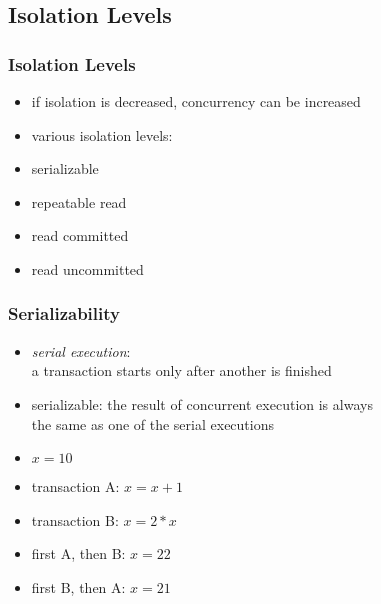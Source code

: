 \documentclass[dvipsnames]{beamer}
\theoremstyle{plain}
\begin{document}
\subsection{Isolation Levels}

\begin{frame}
  \frametitle{Isolation Levels}

  \begin{itemize}
    \item if isolation is decreased, concurrency can be increased
    \item various isolation levels:

    \bigskip
    \item serializable
    \item repeatable read
    \item read committed
    \item read uncommitted
  \end{itemize}
\end{frame}

\begin{frame}
  \frametitle{Serializability}

  \begin{itemize}
    \item \emph{serial execution}:\\
      a transaction starts only after another is finished

    \pause
    \item \alert{serializable}: the result of concurrent execution is always\\
      the same as one of the serial executions
  \end{itemize}

  \pause
  \begin{example}
    \begin{itemize}
      \item $x=10$
      \item transaction A: $x=x+1$
      \item transaction B: $x=2*x$

      \pause
      \medskip
      \item first A, then B: $x=22$
      \item first B, then A: $x=21$
    \end{itemize}
  \end{example}
\end{frame}
\end{document}
